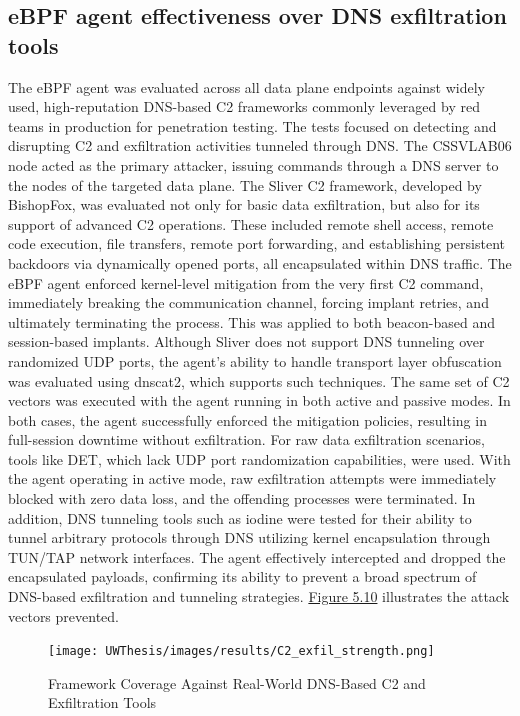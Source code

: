 \documentclass [11pt, proquest] {uwthesis}[2020/02/24]
\begin{document}
\subsection{eBPF agent effectiveness over DNS exfiltration tools}
The eBPF agent was evaluated across all data plane endpoints against widely used, high-reputation DNS-based C2 frameworks commonly leveraged by red teams in production for penetration testing. The tests focused on detecting and disrupting C2 and exfiltration activities tunneled through DNS. The CSSVLAB06 node acted as the primary attacker, issuing commands through a DNS server to the nodes of the targeted data plane.
The Sliver C2 framework, developed by BishopFox, was evaluated not only for basic data exfiltration, but also for its support of advanced C2 operations. These included remote shell access, remote code execution, file transfers, remote port forwarding, and establishing persistent backdoors via dynamically opened ports, all encapsulated within DNS traffic. The eBPF agent enforced kernel-level mitigation from the very first C2 command, immediately breaking the communication channel, forcing implant retries, and ultimately terminating the process. This was applied to both beacon-based and session-based implants.
Although Sliver does not support DNS tunneling over randomized UDP ports, the agent’s ability to handle transport layer obfuscation was evaluated using dnscat2, which supports such techniques. The same set of C2 vectors was executed with the agent running in both active and passive modes. In both cases, the agent successfully enforced the mitigation policies, resulting in full-session downtime without exfiltration.
For raw data exfiltration scenarios, tools like DET, which lack UDP port randomization capabilities, were used. With the agent operating in active mode, raw exfiltration attempts were immediately blocked with zero data loss, and the offending processes were terminated. In addition, DNS tunneling tools such as iodine were tested for their ability to tunnel arbitrary protocols through DNS utilizing kernel encapsulation through TUN/TAP network interfaces. The agent effectively intercepted and dropped the encapsulated payloads, confirming its ability to prevent a broad spectrum of DNS-based exfiltration and tunneling strategies. \hyperref[tab:dns-framework-coverage]{Figure 5.10} illustrates the attack vectors prevented. 

\newpage
\begin{figure}[H]
  \texttt{[image: UWThesis/images/results/C2\_exfil\_strength.png]}
  \caption{Framework Coverage Against Real-World DNS-Based C2 and Exfiltration Tools}
\label{tab:dns-framework-coverage}
\end{figure}
\end{document}

